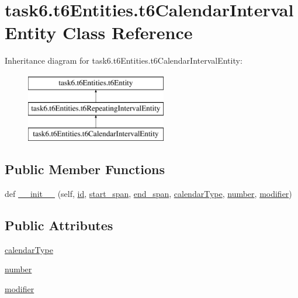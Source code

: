 \hypertarget{classtask6_1_1t6Entities_1_1t6CalendarIntervalEntity}{}\section{task6.\+t6\+Entities.\+t6\+Calendar\+Interval\+Entity Class Reference}
\label{classtask6_1_1t6Entities_1_1t6CalendarIntervalEntity}
Inheritance diagram for task6.\+t6\+Entities.\+t6\+Calendar\+Interval\+Entity\+:\begin{figure}[H]
\begin{center}
\leavevmode
\includegraphics[height=3.000000cm]{classtask6_1_1t6Entities_1_1t6CalendarIntervalEntity}
\end{center}
\end{figure}
\subsection*{Public Member Functions}
\begin{DoxyCompactItemize}
\item 
def \hyperlink{classtask6_1_1t6Entities_1_1t6CalendarIntervalEntity_ae2622ad8387f0acfe36cc9dc0c0bcb81}{\+\_\+\+\_\+init\+\_\+\+\_\+} (self, \hyperlink{classtask6_1_1t6Entities_1_1t6Entity_a96b2e7fb553c920ab2db6f6deb31e3b4}{id}, \hyperlink{classtask6_1_1t6Entities_1_1t6Entity_a8221c36d2995a24200cdfbd74cc9233c}{start\+\_\+span}, \hyperlink{classtask6_1_1t6Entities_1_1t6Entity_a597d42bb02fc9f42277098f0ce21917c}{end\+\_\+span}, \hyperlink{classtask6_1_1t6Entities_1_1t6CalendarIntervalEntity_a59dcb1309f2debf09cd3ea8592287d3d}{calendar\+Type}, \hyperlink{classtask6_1_1t6Entities_1_1t6CalendarIntervalEntity_a03d028a8bee9905395fc9408a4ab88ed}{number}, \hyperlink{classtask6_1_1t6Entities_1_1t6CalendarIntervalEntity_a235a03982b4d7a11aba3099918d90603}{modifier})
\end{DoxyCompactItemize}
\subsection*{Public Attributes}
\begin{DoxyCompactItemize}
\item 
\hyperlink{classtask6_1_1t6Entities_1_1t6CalendarIntervalEntity_a59dcb1309f2debf09cd3ea8592287d3d}{calendar\+Type}
\item 
\hyperlink{classtask6_1_1t6Entities_1_1t6CalendarIntervalEntity_a03d028a8bee9905395fc9408a4ab88ed}{number}
\item 
\hyperlink{classtask6_1_1t6Entities_1_1t6CalendarIntervalEntity_a235a03982b4d7a11aba3099918d90603}{modifier}
\end{DoxyCompactItemize}


